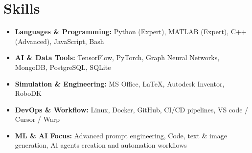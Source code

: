 \section{Skills}

\begin{itemize}
    \item \textbf{Languages \& Programming:} Python (Expert), MATLAB (Expert), C++ (Advanced), JavaScript, Bash
    \item \textbf{AI \& Data Tools:} TensorFlow, PyTorch, Graph Neural Networks, MongoDB, PostgreSQL, SQLite
    \item \textbf{Simulation \& Engineering:} MS Office, LaTeX, Autodesk Inventor, RoboDK
    \item \textbf{DevOps \& Workflow:} Linux, Docker, GitHub, CI/CD pipelines, VS code / Cursor / Warp
    \item \textbf{ML \& AI Focus:} Advanced prompt engineering, Code, text \& image generation, AI agents creation and automation workflows
\end{itemize}
